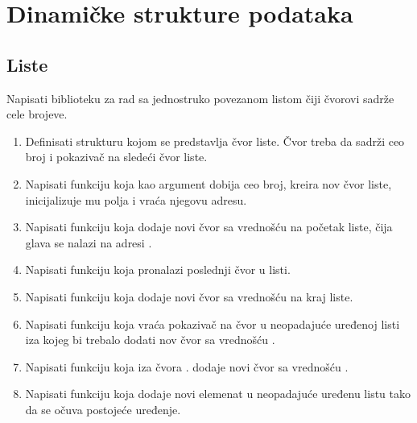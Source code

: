 
\chapter{Dinamičke strukture podataka}

\section{Liste}

\begin{Exercise}[label=4_01]
Napisati biblioteku za rad sa jednostruko povezanom listom čiji čvorovi sadrže cele brojeve. 
\begin{enumerate}
\item Definisati strukturu  kojom se predstavlja čvor liste. Čvor treba da sadrži ceo broj  i pokazivač na sledeći čvor liste.

\item Napisati funkciju  koja kao argument dobija ceo broj, kreira nov čvor liste, inicijalizuje mu polja i vraća njegovu adresu.

 \item Napisati funkciju  koja dodaje novi čvor sa vrednošću  na početak liste, čija glava se nalazi na adresi .

 \item Napisati funkciju  koja pronalazi poslednji čvor u listi.

 \item Napisati funkciju  koja dodaje novi čvor sa vrednošću  na kraj liste.

 \item Napisati funkciju  koja vraća pokazivač na čvor u neopadajuće uređenoj listi iza kojeg bi trebalo dodati nov čvor sa vrednošću .

 \item Napisati funkciju  koja iza čvora . dodaje novi čvor sa vrednošću .

 \item Napisati funkciju  koja dodaje novi elemenat u neopadajuće uređenu listu tako da se očuva postojeće uređenje.


\end{enumerate}
\end{Exercise}
